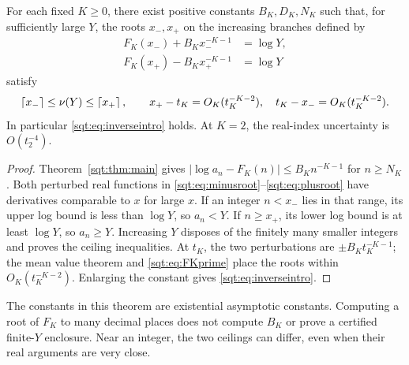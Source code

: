 \begin{theorem}\label{sqt:thm:inverse}
For each fixed $K\geq0$, there exist positive constants $B_K,D_K,N_K$ such that, for sufficiently large $Y$, the roots $x_-,x_+$ on the increasing branches defined by
\begin{align}
F_K(x_-)+B_Kx_-^{-K-1}&=\log Y,\label{sqt:eq:minusroot}\\
F_K(x_+)-B_Kx_+^{-K-1}&=\log Y\label{sqt:eq:plusroot}
\end{align}
satisfy
\begin{equation}\label{sqt:eq:tworoots}
\left\lceil x_-\right\rceil\leq\nu(Y)\leq\left\lceil x_+\right\rceil,\qquad
x_+-t_K=O_K(t_K^{-K-2}),\quad t_K-x_-=O_K(t_K^{-K-2}).
\end{equation}
In particular \eqref{sqt:eq:inverseintro} holds. At $K=2$, the real-index uncertainty is $O(t_2^{-4})$.
\end{theorem}
\begin{proof}
Theorem~\ref{sqt:thm:main} gives
$|\log a_n-F_K(n)|\leq B_Kn^{-K-1}$ for $n\geq N_K$. Both perturbed real functions in \eqref{sqt:eq:minusroot}--\eqref{sqt:eq:plusroot} have derivatives comparable to $x$ for large $x$. If an integer $n<x_-$ lies in that range, its upper log bound is less than $\log Y$, so $a_n<Y$. If $n\geq x_+$, its lower log bound is at least $\log Y$, so $a_n\geq Y$. Increasing $Y$ disposes of the finitely many smaller integers and proves the ceiling inequalities. At $t_K$, the two perturbations are $\pm B_Kt_K^{-K-1}$; the mean value theorem and \eqref{sqt:eq:FKprime} place the roots within $O_K(t_K^{-K-2})$. Enlarging the constant gives \eqref{sqt:eq:inverseintro}.
\end{proof}
The constants in this theorem are existential asymptotic constants. Computing a root of $F_K$ to many decimal places does not compute $B_K$ or prove a certified finite-$Y$ enclosure. Near an integer, the two ceilings can differ, even when their real arguments are very close.

